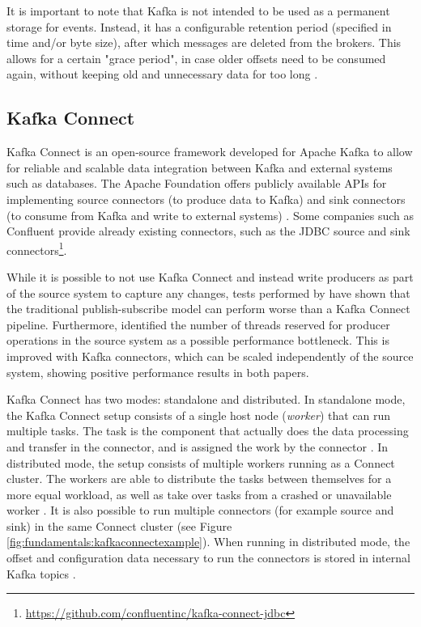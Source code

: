 It is important to note that Kafka is not intended to be used as a permanent storage for events. Instead, it has a configurable retention period (specified in time and/or byte size), after which messages are deleted from the brokers. This allows for a certain "grace period", in case older offsets need to be consumed again, without keeping old and unnecessary data for too long \cite{kreps2011kafka}.

\subsection{Kafka Connect}
\label{ch02:fundamentals:apachekafkaandkafkaconnect:kafkaconnect}
Kafka Connect is an open-source framework developed for Apache Kafka to allow for reliable and scalable data integration between Kafka and external systems such as databases. The Apache Foundation offers publicly available \ac{APIs} for implementing source connectors (to produce data to Kafka) and sink connectors (to consume from Kafka and write to external systems) \cite{kafkadocumentation}. Some companies such as Confluent provide already existing connectors, such as the \ac{JDBC} source and sink connectors\footnote{\url{https://github.com/confluentinc/kafka-connect-jdbc}}.

While it is possible to not use Kafka Connect and instead write producers as part of the source system to capture any changes, tests performed by \cite{srijithkafkaconnectperformance} have shown that the traditional publish-subscribe model can perform worse than a Kafka Connect pipeline. Furthermore, \cite{maison2023kafkaconnect} identified the number of threads reserved for producer operations in the source system as a possible performance bottleneck. This is improved with Kafka connectors, which can be scaled independently of the source system, showing positive performance results in both papers.

Kafka Connect has two modes: standalone and distributed. In standalone mode, the Kafka Connect setup consists of a single host node (\textit{worker}) that can run multiple tasks. The task is the component that actually does the data processing and transfer in the connector, and is assigned the work by the connector \cite{kafkadocumentation}. In distributed mode, the setup consists of multiple workers running as a Connect cluster. The workers are able to distribute the tasks between themselves for a more equal workload, as well as take over tasks from a crashed or unavailable worker \cite{maison2023kafkaconnect}. It is also possible to run multiple connectors (for example source and sink) in the same Connect cluster (see Figure \ref{fig:fundamentals:kafkaconnectexample}). When running in distributed mode, the offset and configuration data necessary to run the connectors is stored in internal Kafka topics \cite{kafkadocumentation}.

